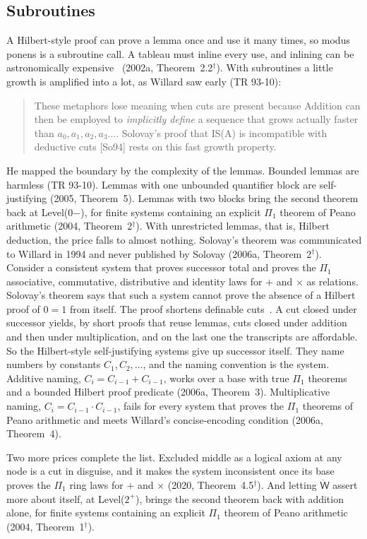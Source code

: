 \documentclass[11pt]{article}
\newcommand{\W}{\ddot{\mathsf{W}}}          %
\newcommand{\sk}{\ensuremath{^\dagger}}    %
\theoremstyle{plain}
\theoremstyle{definition}
\begin{document}
\subsection*{Subroutines}

A Hilbert-style proof can prove a lemma once and use it many times, so modus
ponens is a subroutine call. A tableau must inline every use, and inlining can
be astronomically expensive~\cite{boolos84} (2002a, Theorem~2.2\sk). With
subroutines a little growth is amplified into a lot, as Willard saw early (TR
93-10):
\begin{quote}\small
These metaphors lose meaning when cuts are present because Addition can then
be employed to \emph{implicitly define} a sequence that grows actually faster
than $a_0, a_1, a_2, a_3 \ldots$. Solovay's proof that IS(A) is incompatible
with deductive cuts [So94] rests on this fast growth property.
\end{quote}
He mapped the boundary by the complexity of the lemmas. Bounded lemmas are
harmless (TR 93-10). Lemmas with one unbounded quantifier block are
self-justifying (2005, Theorem~5). Lemmas with two blocks bring the second
theorem back at Level(0$-$), for finite systems containing an explicit
$\Pi_1$ theorem of Peano arithmetic (2004, Theorem~2\sk). With unrestricted
lemmas, that is, Hilbert deduction, the price falls to almost nothing.
Solovay's theorem was communicated to Willard in 1994 and never published by
Solovay (2006a, Theorem~2\sk). Consider a consistent system that proves
successor total and proves the $\Pi_1$ associative, commutative, distributive
and identity laws for $+$ and $\times$ as relations. Solovay's theorem says
that such a system cannot prove the absence of a Hilbert proof of $0 = 1$ from
itself. The proof shortens definable cuts~\cite{pudlak85}. A cut closed under
successor yields, by short proofs that reuse lemmas, cuts closed under
addition and then under multiplication, and on the last one the transcripts
are affordable. So the Hilbert-style self-justifying systems give up
successor itself. They name numbers by constants $C_1, C_2, \ldots$, and the
naming convention is the system. Additive naming, $C_i = C_{i-1} + C_{i-1}$,
works over a base with true $\Pi_1$ theorems and a bounded Hilbert proof
predicate (2006a, Theorem~3).
Multiplicative naming, $C_i = C_{i-1} \cdot C_{i-1}$, fails for every system
that proves the $\Pi_1$ theorems of Peano arithmetic and meets Willard's
concise-encoding condition (2006a, Theorem~4).

Two more prices complete the list. Excluded middle as a logical axiom at any
node is a cut in disguise, and it makes the system inconsistent once its base
proves the $\Pi_1$ ring laws for $+$ and $\times$ (2020, Theorem~4.5\sk).
And letting $\W$
assert more about itself, at Level($2^+$), brings the second theorem back
with addition alone, for finite systems containing an explicit $\Pi_1$
theorem of Peano arithmetic (2004, Theorem~1\sk).
\end{document}
